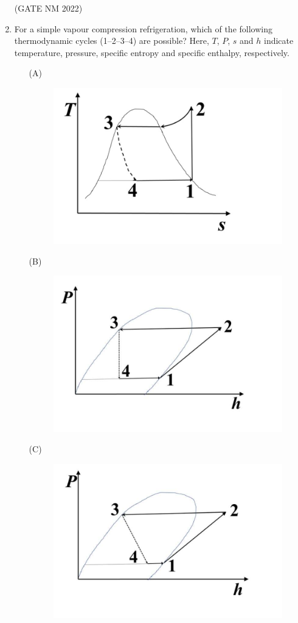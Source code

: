 \documentclass[journal,12pt,onecolumn]{IEEEtran}
\theoremstyle{remark}
\begin{document}
\begin{enumerate}
\hfill(GATE NM 2022)


\item  For a simple vapour compression refrigeration, which of the following thermodynamic cycles (1--2--3--4) are possible?  
Here, $T$, $P$, $s$ and $h$ indicate temperature, pressure, specific entropy and specific enthalpy, respectively.


	\begin{enumerate}
		\item[(A)] \begin{figure}[h]
				\centering
			\includegraphics[width=0.5\columnwidth]{fig8} 
			\caption{}
			\label{fig:placeholder}
		\end{figure}
	\item[(B)]  \begin{figure}[h]
			\centering
			\includegraphics[width=0.5\columnwidth]{fig9} 
			\caption{}
			\label{fig:placeholder}
	\end{figure}
\item [(C)] \begin{figure}[h]
		\centering
			\includegraphics[width=0.5\columnwidth]{fig10}
			\caption{}
			\label{fig:placeholder}
\end{figure}

\end{enumerate}
\end{enumerate}
\end{document}
